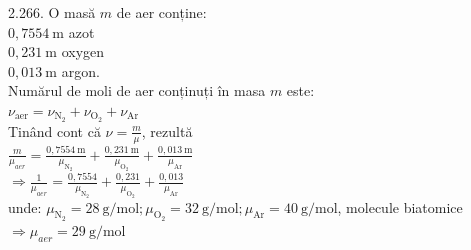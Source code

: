 2.266. O masă $m$ de aer conține:\\ $0,7554 \mathrm{~m}$ azot\\ $0,231 \mathrm{~m}$ oxygen\\ $0,013 \mathrm{~m}$ argon.\\ Numărul de moli de aer conținuți în masa $m$ este:\\ $\nu_{\text{aer}}=\nu_{\mathrm{N}_{2}}+\nu_{\mathrm{O}_{2}}+\nu_{\mathrm{Ar}}$\\ Tinând cont că $\nu=\frac{m}{\mu}$, rezultă\\ $\frac{m}{\mu_{a e r}}=\frac{0,7554 \mathrm{~m}}{\mu_{\mathrm{N}_{2}}}+\frac{0,231 \mathrm{~m}}{\mu_{\mathrm{O}_{2}}}+\frac{0,013 \mathrm{~m}}{\mu_{\mathrm{Ar}}}$\\ $\Rightarrow \frac{1}{\mu_{a e r}}=\frac{0,7554}{\mu_{\mathrm{N}_{2}}}+\frac{0,231}{\mu_{\mathrm{O}_{2}}}+\frac{0,013}{\mu_{\mathrm{Ar}}}$\\ unde: $\mu_{\mathrm{N}_{2}}=28 \mathrm{~g} / \mathrm{mol} ; \mu_{\mathrm{O}_{2}}=32 \mathrm{~g} / \mathrm{mol} ; \mu_{\mathrm{Ar}}=40 \mathrm{~g} / \mathrm{mol}$, molecule biatomice\\ $\Rightarrow \mu_{a e r}=29 \mathrm{~g} / \mathrm{mol}$\\ 

